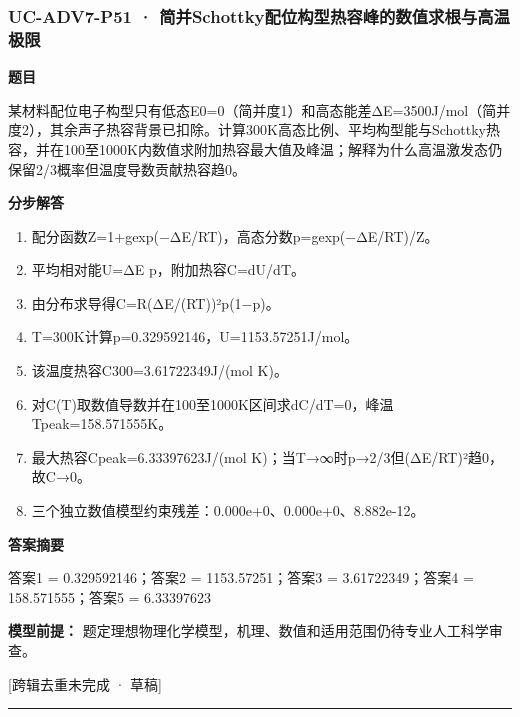 \documentclass[UTF8,11pt,a4paper]{ctexart}
\begin{document}
\subsubsection*{UC-ADV7-P51 · 简并Schottky配位构型热容峰的数值求根与高温极限}
\noindent\textbf{题目}\par
某材料配位电子构型只有低态E0=0（简并度1）和高态能差ΔE=3500J/mol（简并度2），其余声子热容背景已扣除。计算300K高态比例、平均构型能与Schottky热容，并在100至1000K内数值求附加热容最大值及峰温；解释为什么高温激发态仍保留2/3概率但温度导数贡献热容趋0。\par
\medskip\noindent\textbf{分步解答}
\begin{enumerate}
\item 配分函数Z=1+gexp(−ΔE/RT)，高态分数p=gexp(−ΔE/RT)/Z。
\item 平均相对能U=ΔE p，附加热容C=dU/dT。
\item 由分布求导得C=R(ΔE/(RT))²p(1−p)。
\item T=300K计算p=0.329592146，U=1153.57251J/mol。
\item 该温度热容C300=3.61722349J/(mol K)。
\item 对C(T)取数值导数并在100至1000K区间求dC/dT=0，峰温Tpeak=158.571555K。
\item 最大热容Cpeak=6.33397623J/(mol K)；当T→∞时p→2/3但(ΔE/RT)²趋0，故C→0。
\item 三个独立数值模型约束残差：0.000e+0、0.000e+0、8.882e-12。
\end{enumerate}
\noindent\textbf{答案摘要}\par
答案1 = 0.329592146；答案2 = 1153.57251；答案3 = 3.61722349；答案4 = 158.571555；答案5 = 6.33397623\par
\noindent\textbf{模型前提：}
题定理想物理化学模型，机理、数值和适用范围仍待专业人工科学审查。\par
\noindent\textcolor{red!65!black}{[跨辑去重未完成 · 草稿]} \par
\medskip\hrule\medskip
{}
\end{document}
